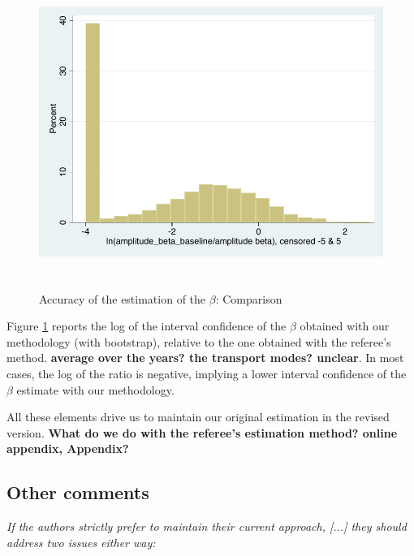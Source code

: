 \documentclass[a4paper,12pt]{article}
\begin{document}
\begin{itemize}
\begin{itemize}
\begin{figure}[htbp]
\caption{Accuracy of the estimation of the $\beta$: Comparison}
\label{fig:accuracy_beta}
\begin{center}
\includegraphics[height=4in]{accuracy_beta.pdf}
\end{center}
\end{figure}

Figure \ref{fig:accuracy_beta} reports the log of the interval confidence of the $\beta$ obtained with our methodology (with bootstrap), relative to the one obtained with the referee's method. \textbf{average over the years? the transport modes? unclear}. In most cases, the log of the ratio is negative, implying a lower interval confidence of the $\beta$ estimate with our methodology.

\end{itemize}
\end{itemize}

All these elements drive us to maintain our original estimation in the revised version. \textbf{What do we do with the referee's estimation method? online appendix, Appendix?}


\subsection{Other comments}

\textit{If the authors strictly prefer to maintain their current
approach, [...] they should address two issues either way:}
\end{document}
